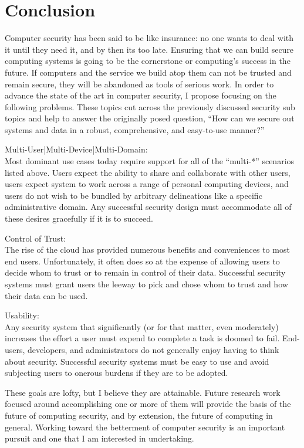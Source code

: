 \documentclass{sig-alternate}
\newenvironment{packed_desc}{
\begin{description}
  \setlength{\itemsep}{1pt}
  \setlength{\parskip}{0pt}
  \setlength{\parsep}{0pt}
}{\end{description}}
\begin{document}
\section{Conclusion}
\label{sec:conclusion}

Computer security has been said to be like insurance: no one wants to
deal with it until they need it, and by then its too late. Ensuring
that we can build secure computing systems is going to be the
cornerstone or computing's success in the future. If computers and the
service we build atop them can not be trusted and remain secure, they
will be abandoned as tools of serious work. In order to advance the
state of the art in computer security, I propose focusing on the
following problems. These topics cut across the previously discussed
security sub topics and help to answer the originally posed question,
``How can we secure out systems and data in a robust, comprehensive,
and easy-to-use manner?''

\begin{packed_desc}
\item{Multi-User|Multi-Device|Multi-Domain}: \hfill \\ Most dominant
  use cases today require support for all of the ``multi-*'' scenarios
  listed above. Users expect the ability to share and collaborate with
  other users, users expect system to work across a range of personal
  computing devices, and users do not wish to be bundled by arbitrary
  delineations like a specific administrative domain. Any successful
  security design must accommodate all of these desires gracefully if
  it is to succeed.
\item{Control of Trust}: \hfill \\ The rise of the cloud has provided
  numerous benefits and conveniences to most end users. Unfortunately,
  it often does so at the expense of allowing users to decide whom to
  trust or to remain in control of their data. Successful security
  systems must grant users the leeway to pick and chose whom to trust
  and how their data can be used.
\item{Usability}: \hfill \\ Any security system that significantly (or
  for that matter, even moderately) increases the effort a user must
  expend to complete a task is doomed to fail. End-users, developers,
  and administrators do not generally enjoy having to think about
  security. Successful security systems must be easy to use and avoid
  subjecting users to onerous burdens if they are to be adopted.
\end{packed_desc}

These goals are lofty, but I believe they are attainable. Future
research work focused around accomplishing one or more of them will
provide the basis of the future of computing security, and by
extension, the future of computing in general. Working toward the
betterment of computer security is an important pursuit and one that I
am interested in undertaking.

\vfill
\break



\end{document}
